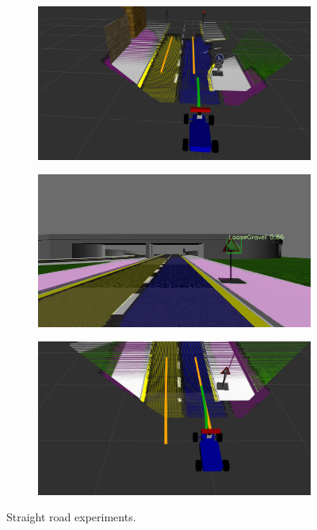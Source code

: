 \begin{figure}[h]
\begin{subfigure}[b]{0.45\linewidth}
  \end{subfigure}
  \begin{subfigure}[b]{0.45\linewidth}
    \includegraphics[width=\linewidth]{figures/experiments/straight-or-right-pc.png}
  \end{subfigure}
  \begin{subfigure}[b]{0.45\linewidth}
    \includegraphics[width=\linewidth]{figures/experiments/loose-gravel-img.png}
  \end{subfigure}
  \begin{subfigure}[b]{0.45\linewidth}
    \includegraphics[width=\linewidth]{figures/experiments/loose-gravel-pc.png}
  \end{subfigure}
  \caption{Straight road experiments.}
  \label{figure:normal-driving}
\end{figure}

